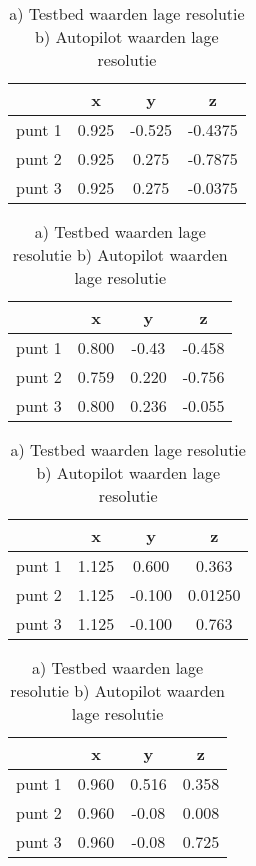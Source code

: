 \begin{table}[!h]
	\centering
 	\begin{tabular}{l|c|c|c}
 		& x & y & z \\ \hline
 		punt 1 & 0.925 & -0.525 & -0.4375 \\
 		punt 2 & 0.925 & 0.275 & -0.7875 \\
 		punt 3 & 0.925 & 0.275 & -0.0375
 	\end{tabular}
 	\begin{tabular}{l|c|c|c}
 		& x & y & z \\ \hline
 		punt 1 & 0.800 & -0.43 & -0.458 \\
 		punt 2 & 0.759 & 0.220 & -0.756 \\
 		punt 3 & 0.800 & 0.236 & -0.055
 	\end{tabular}
\caption{a) Testbed waarden lage resolutie  b) Autopilot waarden lage resolutie}
\label{table: lageResolutie1}
\end{table}
\begin{table}[!h]
	\centering
	\begin{tabular}{l|c|c|c}
		& x & y & z \\ \hline
		punt 1 & 1.125 & 0.600 & 0.363 \\
		punt 2 & 1.125 & -0.100 & 0.01250 \\
		punt 3 & 1.125 & -0.100 & 0.763
	\end{tabular}
	\begin{tabular}{l|c|c|c}
		& x & y & z \\ \hline
		punt 1 & 0.960 & 0.516 & 0.358 \\
		punt 2 & 0.960 & -0.08 & 0.008 \\
		punt 3 & 0.960 & -0.08 & 0.725
	\end{tabular}
\caption{a) Testbed waarden lage resolutie  b) Autopilot waarden lage resolutie}
\label{table: lageResolutie2}
\end{table}

